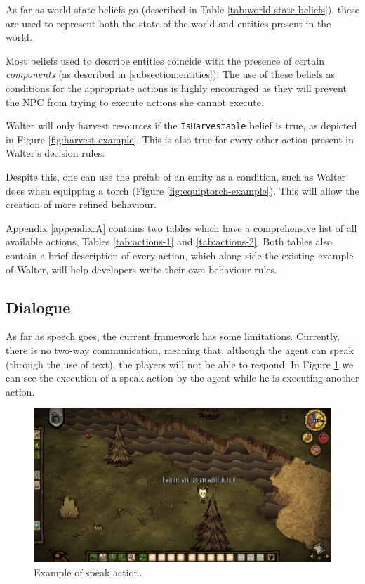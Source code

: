 As far as world state beliefs go (described in Table \ref{tab:world-state-beliefs}), these are used to represent both the state of the world and entities present in the world.

Most beliefs used to describe entities coincide with the presence of certain \textit{components} (as described in \ref{subsection:entities}).
The use of these beliefs as conditions for the appropriate actions is highly encouraged as they will prevent the \ac{NPC} from trying to execute actions she cannot execute.

Walter will only harvest resources if the \texttt{IsHarvestable} belief is true, as depicted in Figure \ref{fig:harvest-example}.
This is also true for every other action present in Walter's decision rules.

Despite this, one can use the prefab of an entity as a condition, such as Walter does when equipping a torch (Figure \ref{fig:equiptorch-example}).
This will allow the creation of more refined behaviour.

Appendix \ref{appendix:A} contains two tables which have a comprehensive list of all available actions, Tables \ref{tab:actions-1} and \ref{tab:actions-2}.
Both tables also contain a brief description of every action, which along side the existing example of Walter, will help developers write their own behaviour rules.

\subsection{Dialogue}

\noindent As far as speech goes, the current framework has some limitations.
Currently, there is no two-way communication, meaning that, although the agent can speak (through the use of text), the players will not be able to respond.
In Figure \ref{fig:axe-dialogue} we can see the execution of a speak action by the agent while he is executing another action.

\begin{figure}
  \centering
  \includegraphics[width=\textwidth]{./Images/axe-dialogue}
  \caption{Example of speak action.}
  \label{fig:axe-dialogue}
\end{figure}

